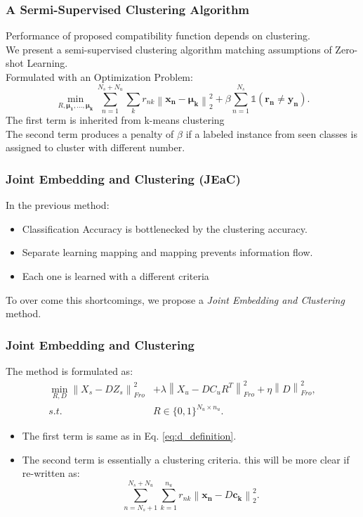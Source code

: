 \documentclass{beamer}
\newcommand{\normtwo}[1]{\left \lVert #1 \right \rVert_2^2}
\newcommand{\normf}[1]{\left \lVert #1 \right \rVert_{Fro}}
\begin{document}
\begin{frame}\frametitle{A Sermi-Supervised Clustering Algorithm}
  Performance of proposed compatibility function depends on clustering.\\
  We present a semi-supervised clustering algorithm matching assumptions of Zero-shot Learning. \\
  Formulated with an Optimization Problem:
  \begin{equation} \label{eq:my_clustering}
\min_{R, \boldsymbol{\mu_1, \ldots, \mu_k }} \sum_{n=1}^{N_s + N_u}  \sum_{k} r_{nk} \normtwo{\mathbf{x_n} - \boldsymbol{\mu_k}} +
 \beta \sum_{n=1}^{N_s} \mathds{1}(\mathbf{r_n} \neq \mathbf{y_n}).
\end{equation}
The first term is inherited from k-means clustering \\
\vspace{1mm}
The second term produces a penalty of $\beta$ if a labeled instance from seen classes
is assigned to cluster with different number.
\end{frame}

\begin{frame}\frametitle{Joint Embedding and Clustering (JEaC)}
In the previous method:
\begin{itemize}
  \item Classification Accuracy is bottlenecked by the clustering accuracy.
  \item Separate learning mapping and mapping prevents information flow.
  \item Each one is learned with a different criteria
\end{itemize}
To over come this shortcomings, we propose a \textit{Joint Embedding and Clustering} method.
\end{frame}
\begin{frame}\frametitle{Joint Embedding and Clustering}
The method is formulated as:
\begin{align}
\label{eq:joint}
 \min_{R,D} \normf{X_s - D Z_s}^2  &+ \lambda \normf{X_u - D C_u R^T }^2 + \eta \normf{D}^2, \\
   s.t. \quad & R \in \{0,1\}^{N_u \times n_u}. \nonumber
\end{align}
\begin{itemize}
  \item
  The first term is same as in Eq. \eqref{eq:d_definition}.
  \item
  The second term is essentially a clustering criteria. this will be more clear if re-written as:
  \[
  \label{eq:essentialy_clustering}
\sum_{n=N_s+1}^{N_s + N_u} \sum_{k=1}^{n_u} r_{nk} \normtwo{\mathbf{x_n} - D \mathbf{c_k}}.
  \]
\end{itemize}
\end{frame}
\end{document}
